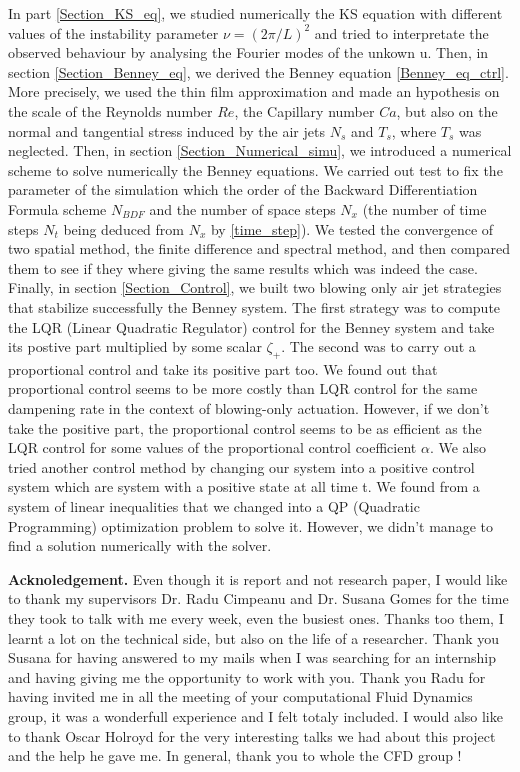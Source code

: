 \documentclass[12pt]{article}
\begin{document}
In part \ref{Section_KS_eq}, we studied numerically the 
KS equation with different values of the instability parameter $\nu = (2\pi/L)^2$ and tried
to interpretate the observed behaviour by analysing the Fourier modes of the unkown u. Then, in 
section \ref{Section_Benney_eq}, we derived the Benney equation \eqref{Benney_eq_ctrl}. More precisely,
we used the thin film approximation and made an hypothesis on the scale of the Reynolds number $Re$, the Capillary
number $Ca$, but also on the normal and tangential stress induced by the air jets $N_s$ and $T_s$, where $T_s$ was 
neglected. Then, in section \ref{Section_Numerical_simu}, we introduced a numerical scheme to solve numerically
the Benney equations. We carried out test to fix the parameter of the simulation which the order of the 
Backward Differentiation Formula scheme $N_{BDF}$ and the number of space steps $N_x$ (the number of time 
steps $N_t$ being deduced from $N_x$ by \eqref{time_step}). We tested the convergence of two spatial method, 
the finite difference and spectral method, and then compared them to see if they where giving the same results
which was indeed the case. Finally, in section \ref{Section_Control}, we built two blowing only air jet strategies
that stabilize successfully the Benney system. The first strategy was to compute the LQR (Linear Quadratic Regulator)
control for the Benney system and take its postive part multiplied by some scalar $\zeta_+$. The second was to carry out 
a proportional control and take its positive part too. We found out that proportional control seems to be 
more costly than LQR control for the same dampening rate in the context of blowing-only actuation. However, if we 
don't take the positive part, the proportional control seems to be as efficient as the LQR control for some values of the 
proportional control coefficient $\alpha$. We also tried another control method by changing our system into a positive control
system which are system with a positive state at all time t. We found from \cite{pos_ctrl_paper} a system of linear inequalities
that we changed into a QP (Quadratic Programming) optimization problem to solve it. However, we didn't manage to find a solution
numerically with the solver. 


\textbf{Acknoledgement.} Even though it is report and not research paper, I would like to thank my supervisors Dr. Radu
Cimpeanu and Dr. Susana Gomes for the time they took to talk with me every week, even the busiest ones. Thanks too them, I learnt a lot on the 
technical side, but also on the life of a researcher. Thank you Susana for having answered to my mails when I was searching 
for an internship and having giving me the opportunity to work with you. Thank you Radu for having invited me in all the 
meeting of your computational Fluid Dynamics group, it was a wonderfull experience and I felt totaly included. I would 
also like to thank Oscar Holroyd for the very interesting talks we had about this project and the help he gave
me. In general, thank you to whole the CFD group ! 
\end{document}
